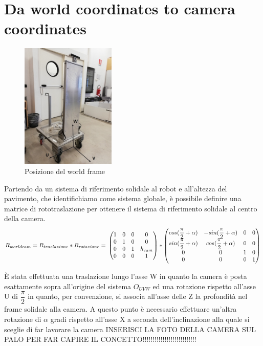 \section{Da world coordinates to camera coordinates}
\begin{figure}[H]
	\centering
	\includegraphics[width=0.4\textwidth]{Immagini/SupportoCamera_asse1.jpg}
	\caption{Posizione del world frame}
	\label{fig:worldframe}
\end{figure}

Partendo da un sistema di riferimento solidale al robot e all'altezza del pavimento, che identifichiamo come sistema globale, è possibile definire una matrice di rototraslazione per ottenere il sistema di riferimento solidale al centro della camera.
\begin{equation*}
R_{worldcam} = R_{traslazione}*R_{rotazione} =\\
\begin{pmatrix}
1 & 0 & 0 & 0 \\
0 & 1 & 0 & 0 \\
0 & 0 & 1 & h_{cam} \\
0 & 0 & 0 & 1 \\
\end{pmatrix}*
\begin{pmatrix}
cos(\dfrac{\pi}{2}+\alpha) & -sin(\dfrac{\pi}{2}+\alpha) & 0 & 0 \\
sin(\dfrac{\pi}{2}+\alpha) & cos(\dfrac{\pi}{2}+\alpha)& 0 & 0 \\
0 & 0 & 1 & 0 \\
0 & 0 & 0 & 1 \\
\end{pmatrix}
\end{equation*}

È stata effettuata una traslazione lungo l'asse W in quanto la camera è posta esattamente sopra all'origine del sistema $O_{UVW}$ ed una rotazione rispetto all'asse U di $ \dfrac{\pi}{2}$ in quanto, per convenzione, si associa all'asse delle Z la profondità nel frame solidale alla camera.
A questo punto è necessario effettuare un'altra rotazione di $\alpha$ gradi rispetto all'asse X a seconda dell'inclinazione alla quale si sceglie di far lavorare la camera
INSERISCI LA FOTO DELLA CAMERA SUL PALO PER FAR CAPIRE IL CONCETTO!!!!!!!!!!!!!!!!!!!!!!!!!!!

